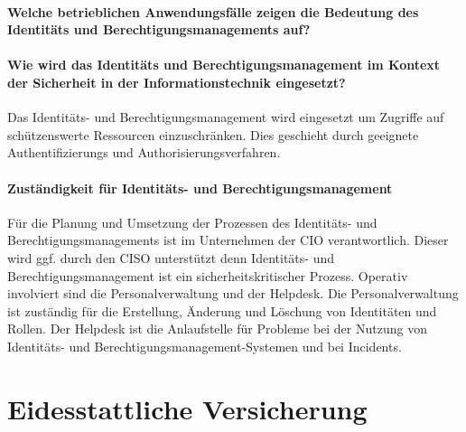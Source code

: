 \documentclass[12pt]{article}
\begin{document}
\paragraph{Welche betrieblichen Anwendungsfälle zeigen die Bedeutung des Identitäts und Berechtigungsmanagements auf?}
\paragraph{Wie wird das Identitäts und Berechtigungsmanagement im Kontext der Sicherheit in der Informationstechnik eingesetzt?}
Das Identitäts- und Berechtigungsmanagement wird eingesetzt um Zugriffe auf schützenswerte Ressourcen einzuschränken. Dies geschieht durch geeignete Authentifizierungs und Authorisierungsverfahren.
\paragraph{Zuständigkeit für Identitäts- und Berechtigungsmanagement}
Für die Planung und Umsetzung der Prozessen des Identitäts- und Berechtigungsmanagements ist im Unternehmen der CIO verantwortlich. Dieser wird ggf. durch den CISO unterstützt denn Identitäts- und Berechtigungsmanagement ist ein sicherheitskritischer Prozess. Operativ involviert sind die Personalverwaltung und der Helpdesk. Die Personalverwaltung ist zuständig für die Erstellung, Änderung und Löschung von Identitäten und Rollen. Der Helpdesk ist die Anlaufstelle für Probleme bei der Nutzung von Identitäts- und Berechtigungsmanagement-Systemen und bei Incidents.
\newpage
\section{Eidesstattliche Versicherung}
\newpage
\printbibliography[notkeyword={quelle}, title={Literaturverzeichnis}]
\newpage
\printbibliography[keyword={quelle}, title={Quellenverzeichnis}]
\newpage
\listoffigures
\end{document}

